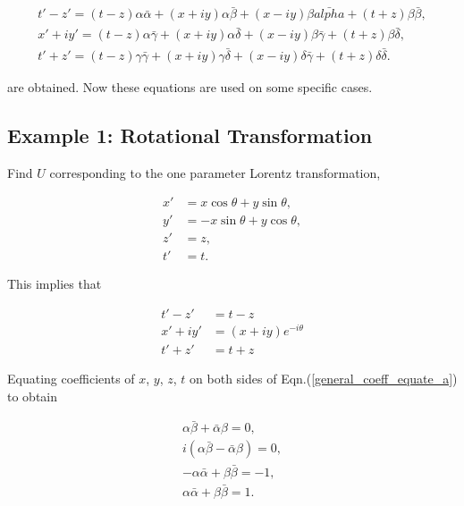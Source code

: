 \begin{subequations}
\begin{gather}\label{general_coeff_equate_a}
t' - z'  = (t-z)\alpha\bar{\alpha} + (x + iy)\alpha\bar{\beta} + (x - iy)\beta\bar{alpha} + (t+z)\beta\bar{\beta},
\\\label{general_coeff_equate_b}
x' + iy'  = (t-z)\alpha\bar{\gamma} + (x + iy)\alpha\bar{\delta} + (x-iy)\beta\bar{\gamma} + (t+z)\beta\bar{\delta},
\\\label{general_coeff_equate_c}
t' + z'  = (t-z)\gamma\bar{\gamma} + (x + iy)\gamma\bar{\delta} + (x-iy)\delta\bar{\gamma} + (t+z)\delta\bar{\delta}.
\end{gather}
\end{subequations}

\noindent are obtained. Now these equations are used on some specific cases.

\subsection{Example 1: Rotational Transformation}

\noindent Find $U$ corresponding to the one parameter Lorentz transformation,

\begin{align*} 
x' & = x\cos{\theta} + y\sin{\theta}, \\
y' & = -x\sin{\theta} + y\cos{\theta}, \\
z' & = z, \\
t' & = t.
\end{align*} 

\noindent This implies that

\begin{align*}
t'-z' & = t-z \\
x'+iy' & = (x+iy) e^{-i \theta} \\
t'+z' & = t+z
\end{align*}

\noindent Equating coefficients of $x$, $y$, $z$, $t$ on both sides of Eqn.(\ref{general_coeff_equate_a}) to obtain

\begin{subequations}
\begin{gather}\label{Ex1_equate_coeffs_first_a}
\alpha \bar{\beta} + \bar{\alpha} \beta = 0, \\\label{Ex1_equate_coeffs_first_b}
i (\alpha \bar{\beta} - \bar{\alpha} \beta) = 0, \\\label{Ex1_equate_coeffs_first_c}
-\alpha \bar{\alpha} + \beta \bar{\beta} = -1, \\\label{Ex1_equate_coeffs_first_d}
\alpha \bar{\alpha} + \beta \bar{\beta} = 1. 
\end{gather}
\end{subequations}

